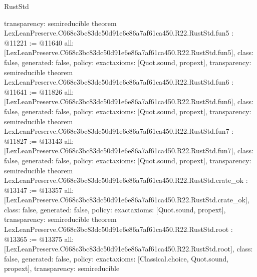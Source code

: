 \begin{lexlean}{RustStd}
\begin{coremodule}
{  transparency: semireducible
}
theorem LexLeanPreserve.C668c3bc83dc50d91e6e86a7af61ca450.R22.RustStd.fun5 : @11221 := @11640 {
  all: [LexLeanPreserve.C668c3bc83dc50d91e6e86a7af61ca450.R22.RustStd.fun5],
  class: false,
  generated: false,
  policy: exact{axioms: [Quot.sound, propext]},
  transparency: semireducible
}
theorem LexLeanPreserve.C668c3bc83dc50d91e6e86a7af61ca450.R22.RustStd.fun6 : @11641 := @11826 {
  all: [LexLeanPreserve.C668c3bc83dc50d91e6e86a7af61ca450.R22.RustStd.fun6],
  class: false,
  generated: false,
  policy: exact{axioms: [Quot.sound, propext]},
  transparency: semireducible
}
theorem LexLeanPreserve.C668c3bc83dc50d91e6e86a7af61ca450.R22.RustStd.fun7 : @11827 := @13143 {
  all: [LexLeanPreserve.C668c3bc83dc50d91e6e86a7af61ca450.R22.RustStd.fun7],
  class: false,
  generated: false,
  policy: exact{axioms: [Quot.sound, propext]},
  transparency: semireducible
}
theorem LexLeanPreserve.C668c3bc83dc50d91e6e86a7af61ca450.R22.RustStd.crate_ok : @13147 := @13357 {
  all: [LexLeanPreserve.C668c3bc83dc50d91e6e86a7af61ca450.R22.RustStd.crate_ok],
  class: false,
  generated: false,
  policy: exact{axioms: [Quot.sound, propext]},
  transparency: semireducible
}
theorem LexLeanPreserve.C668c3bc83dc50d91e6e86a7af61ca450.R22.RustStd.root : @13365 := @13375 {
  all: [LexLeanPreserve.C668c3bc83dc50d91e6e86a7af61ca450.R22.RustStd.root],
  class: false,
  generated: false,
  policy: exact{axioms: [Classical.choice, Quot.sound, propext]},
  transparency: semireducible
}


\end{coremodule}
\end{lexlean}
